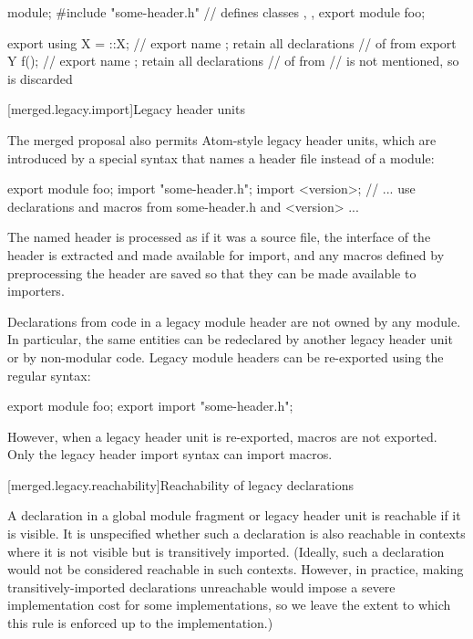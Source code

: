\pnum
\begin{example}
\begin{codeblock}
module;
#include "some-header.h" // defines classes , , 
export module foo;

export using X = ::X; // export name ; retain all declarations
                      // of  from 
export Y f(); // export name ; retain all declarations
              // of  from 
//  is not mentioned, so is discarded
\end{codeblock}
\end{example}

[merged.legacy.import]{Legacy header units}

\pnum
The merged proposal also permits Atom-style legacy header units,
which are introduced by a special  syntax
that names a header file instead of a module:

\begin{codeblock}
export module foo;
import "some-header.h";
import <version>;
// ... use declarations and macros from some-header.h and <version> ...
\end{codeblock}

\pnum
The named header is processed as if it was a source file,
the interface of the header is extracted and made available for import,
and any macros defined by preprocessing the header are saved
so that they can be made available to importers.

\pnum
Declarations from code in a legacy module header
are not owned by any module.
In particular, the same entities can be redeclared
by another legacy header unit or by non-modular code.
Legacy module headers can be re-exported
using the regular  syntax:

\begin{codeblock}
export module foo;
export import "some-header.h";
\end{codeblock}

However, when a legacy header unit is re-exported,
macros are not exported.
Only the legacy header import syntax can import macros.

[merged.legacy.reachability]{Reachability of legacy declarations}

\pnum
A declaration in a global module fragment or legacy header unit
is reachable if it is visible.
It is unspecified whether such a declaration is also reachable
in contexts where it is not visible but is transitively
imported.
(Ideally, such a declaration would not be considered reachable
in such contexts. However, in practice, making transitively-imported
declarations unreachable would impose a severe implementation
cost for some implementations, so we leave the extent to which
this rule is enforced up to the implementation.)

